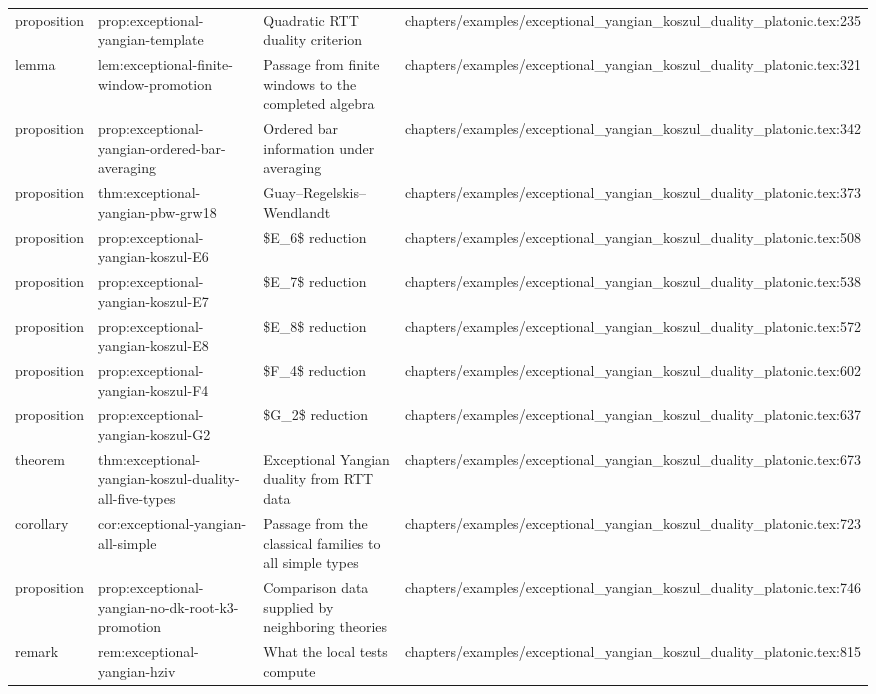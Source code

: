 \documentclass[11pt]{article}
\begin{document}
\begin{longtable}{L{0.10\textwidth}L{0.26\textwidth}L{0.42\textwidth}L{0.22\textwidth}}
proposition & prop:exceptional-yangian-template & Quadratic RTT duality criterion & chapters/examples/exceptional\_yangian\_koszul\_duality\_platonic.tex:235\\
lemma & lem:exceptional-finite-window-promotion & Passage from finite windows to the completed algebra & chapters/examples/exceptional\_yangian\_koszul\_duality\_platonic.tex:321\\
proposition & prop:exceptional-yangian-ordered-bar-averaging & Ordered bar information under averaging & chapters/examples/exceptional\_yangian\_koszul\_duality\_platonic.tex:342\\
proposition & thm:exceptional-yangian-pbw-grw18 & Guay--Regelskis--Wendlandt & chapters/examples/exceptional\_yangian\_koszul\_duality\_platonic.tex:373\\
proposition & prop:exceptional-yangian-koszul-E6 & \$E\_6\$ reduction & chapters/examples/exceptional\_yangian\_koszul\_duality\_platonic.tex:508\\
proposition & prop:exceptional-yangian-koszul-E7 & \$E\_7\$ reduction & chapters/examples/exceptional\_yangian\_koszul\_duality\_platonic.tex:538\\
proposition & prop:exceptional-yangian-koszul-E8 & \$E\_8\$ reduction & chapters/examples/exceptional\_yangian\_koszul\_duality\_platonic.tex:572\\
proposition & prop:exceptional-yangian-koszul-F4 & \$F\_4\$ reduction & chapters/examples/exceptional\_yangian\_koszul\_duality\_platonic.tex:602\\
proposition & prop:exceptional-yangian-koszul-G2 & \$G\_2\$ reduction & chapters/examples/exceptional\_yangian\_koszul\_duality\_platonic.tex:637\\
theorem & thm:exceptional-yangian-koszul-duality-all-five-types & Exceptional Yangian duality from RTT data & chapters/examples/exceptional\_yangian\_koszul\_duality\_platonic.tex:673\\
corollary & cor:exceptional-yangian-all-simple & Passage from the classical families to all simple types & chapters/examples/exceptional\_yangian\_koszul\_duality\_platonic.tex:723\\
proposition & prop:exceptional-yangian-no-dk-root-k3-promotion & Comparison data supplied by neighboring theories & chapters/examples/exceptional\_yangian\_koszul\_duality\_platonic.tex:746\\
remark & rem:exceptional-yangian-hziv & What the local tests compute & chapters/examples/exceptional\_yangian\_koszul\_duality\_platonic.tex:815\\

\end{longtable}
\end{document}
